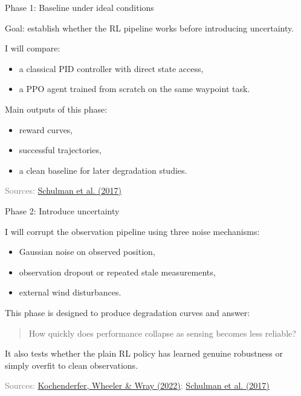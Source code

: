 \documentclass[11pt]{beamer}
\newcommand{\srcKochenderferADM}{\href{https://algorithmsbook.com}{Kochenderfer, Wheeler \& Wray (2022)}}
\newcommand{\srcSchulman}{\href{https://arxiv.org/abs/1707.06347}{Schulman et al. (2017)}}
\newcommand{\SourceLine}[1]{\vfill{\tiny\textcolor{gray}{Sources: #1}}}
\begin{document}

\begin{frame}{Phase 1: Baseline under ideal conditions}

Goal: establish whether the RL pipeline works before introducing uncertainty.

\medskip
I will compare:
\begin{itemize}
  \item a classical PID controller with direct state access,
  \item a PPO agent trained from scratch on the same waypoint task.
\end{itemize}

Main outputs of this phase:
\begin{itemize}
  \item reward curves,
  \item successful trajectories,
  \item a clean baseline for later degradation studies.
\end{itemize}

\SourceLine{\srcSchulman}
\end{frame}


\begin{frame}{Phase 2: Introduce uncertainty}

I will corrupt the observation pipeline using three noise mechanisms:
\begin{itemize}
  \item Gaussian noise on observed position,
  \item observation dropout or repeated stale measurements,
  \item external wind disturbances.
\end{itemize}

\medskip
This phase is designed to produce degradation curves and answer:
\begin{quote}
How quickly does performance collapse as sensing becomes less reliable?
\end{quote}

\medskip
It also tests whether the plain RL policy has learned genuine robustness or simply overfit to clean observations.

\SourceLine{\srcKochenderferADM; \srcSchulman}
\end{frame}

\end{document}
